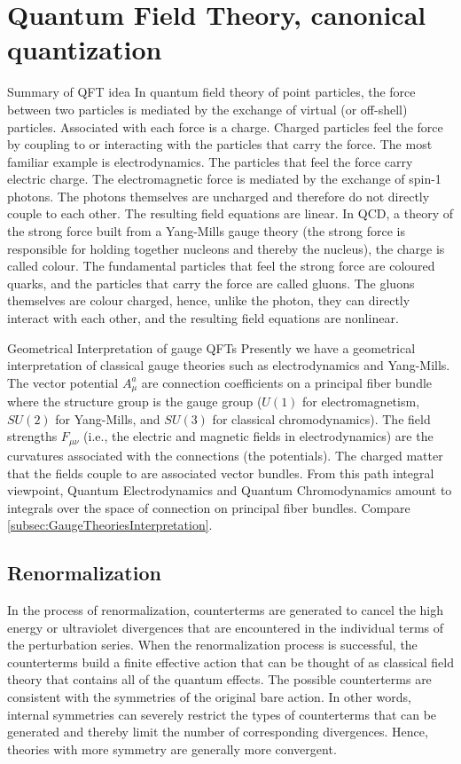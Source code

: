 \chapter{Quantum Field Theory, canonical quantization}
\begin{mybox}{Summary of QFT idea}
	In quantum field theory of point particles, the force between two particles is mediated by the exchange of virtual (or off-shell) particles. Associated with each force is a charge. Charged particles feel the force by coupling to or interacting with the particles that carry the force. The most familiar example is electrodynamics. The particles that feel the force carry electric charge. The electromagnetic force is mediated by the exchange of spin-1 photons. The photons themselves are uncharged and therefore do not directly couple to each other. The resulting field equations are linear. In QCD, a theory of the strong force built from a Yang-Mills gauge theory (the strong force is responsible for holding together nucleons and thereby the nucleus), the charge is called colour. The fundamental particles that feel the strong force are coloured quarks, and the particles that carry the force are called gluons. The gluons themselves are colour charged, hence, unlike the photon, they can directly interact with each other, and the resulting field equations are nonlinear. 
\end{mybox}
\begin{mybox}{Geometrical Interpretation of gauge QFTs}
	Presently we have a geometrical interpretation of classical gauge theories such as electrodynamics and Yang-Mills. The vector potential $A^a_{\mu}$ are connection coefficients on a principal fiber bundle where the structure group is the gauge group ($U(1)$ for electromagnetism, $SU(2)$ for Yang-Mills, and $SU(3)$ for classical chromodynamics). The field strengths $F_{\mu \nu}$ (i.e., the electric and magnetic fields in electrodynamics) are the curvatures associated with the connections (the potentials). The charged matter that the fields couple to are associated vector bundles. From this path integral viewpoint, Quantum Electrodynamics and Quantum Chromodynamics amount to integrals over the space of connection on principal fiber bundles. 
	Compare \ref{subsec:GaugeTheoriesInterpretation}.
\end{mybox}

\section{Renormalization}
In the process of renormalization, counterterms are generated to cancel the high energy or ultraviolet divergences that are encountered in the individual terms of the perturbation series. When the renormalization process is successful, the counterterms build a finite effective action that can be thought of as classical field theory that contains all of the quantum effects. The possible counterterms are consistent with the symmetries of the original bare action. In other words, internal symmetries can severely restrict the types of counterterms that can be generated and thereby limit the number of corresponding divergences. Hence, theories with more symmetry are generally more convergent.
